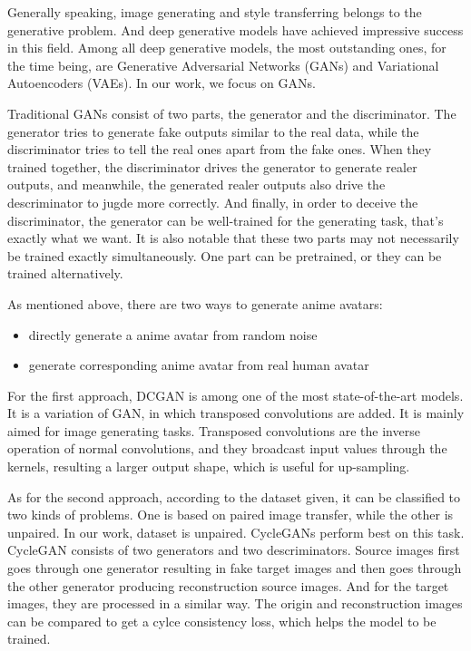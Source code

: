 \documentclass[10pt,twocolumn,letterpaper]{article}
\begin{document}
Generally speaking, image generating and style transferring belongs to the
generative problem. And deep generative models have achieved impressive success
in this field. Among all deep generative models, the most outstanding ones, for
the time being, are Generative Adversarial Networks (GANs) and Variational
Autoencoders (VAEs). In our work, we focus on GANs.

Traditional GANs consist of two parts, the generator and the discriminator. The
generator tries to generate fake outputs similar to the real data, while the
discriminator tries to tell the real ones apart from the fake ones. When they
trained together, the discriminator drives the generator to generate realer
outputs, and meanwhile, the generated realer outputs also drive the
descriminator to jugde more correctly. And finally, in order to deceive the
discriminator, the generator can be well-trained for the generating task, that's
exactly what we want. It is also notable that these two parts may not
necessarily be trained exactly simultaneously. One part can be pretrained, or
they can be trained alternatively.

As mentioned above, there are two ways to generate anime avatars:

\begin{itemize}[noitemsep, topsep=0pt]
   \item directly generate a anime avatar from random noise
   \item generate corresponding anime avatar from real human avatar
\end{itemize}

For the first approach, DCGAN is among one of the most state-of-the-art models.
It is a variation of GAN, in which transposed convolutions are added. It is
mainly aimed for image generating tasks. Transposed convolutions are the inverse
operation of normal convolutions, and they broadcast input values through the
kernels, resulting a larger output shape, which is useful for up-sampling.

As for the second approach, according to the dataset given, it can be classified
to two kinds of problems. One is based on paired image transfer, while the other
is unpaired. In our work, dataset is unpaired. CycleGANs perform best on this
task. CycleGAN consists of two generators and two descriminators. Source images
first goes through one generator resulting in fake target images and then goes
through the other generator producing reconstruction source images. And for the
target images, they are processed in a similar way. The origin and
reconstruction images can be compared to get a cylce consistency loss, which
helps the model to be trained.
\end{document}
